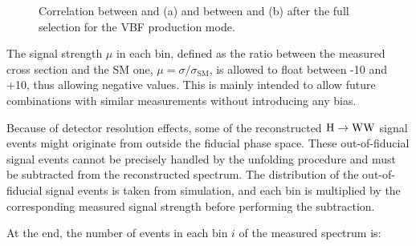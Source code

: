 \begin{figure}[htb]
\centering
{}
\caption{Correlation between \pth and \mll (a) and between \pth and \mt (b) after the full selection for the VBF production mode.\label{fig:correlation_vbf}}
\end{figure}

The signal strength $\mu$ in each bin, defined as the ratio between the measured cross section and the SM one, $\mu = \sigma/\sigma_\mathrm{SM}$, is allowed to float between -10 and +10, thus allowing negative values. This is mainly intended to allow future combinations with similar measurements without introducing any bias.

Because of detector resolution effects, some of the reconstructed ${\mathrm{H}\to\mathrm{WW}}$ signal events might originate from outside the fiducial phase space.  
These out-of-fiducial signal events cannot be precisely handled by the unfolding procedure and must be subtracted from the reconstructed spectrum. The \pth distribution of the out-of-fiducial signal events is taken from simulation, and each bin is multiplied by the corresponding measured signal strength before performing the subtraction. 

At the end, the number of events in each bin $i$ of the measured spectrum is:

